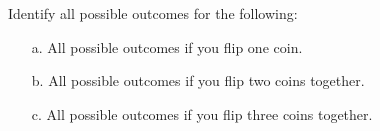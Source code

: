     \hrulefill

    \begin{questionNOGRADE}{\thequestion}

        Identify all possible outcomes for the following:

        \begin{enumerate}
            \item[a.]   All possible outcomes if you flip one coin.
            
            \item[b.]   All possible outcomes if you flip two coins together.
            
            \item[c.]   All possible outcomes if you flip three coins together.
        \end{enumerate}
        
    \end{questionNOGRADE}

    \newpage

